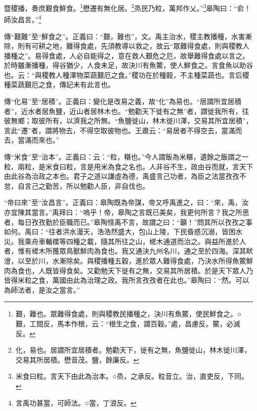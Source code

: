 暨稷播，奏庶艱食鮮食。\footnote{艱，難也。眾難得食處，則與稷教民播種之，決川有魚鱉，使民鮮食之。○艱，工間反，馬本作根，云：“根生之食，謂百穀。”處，昌慮反。鱉，必滅反。}懋遷有無化居。\footnote{化，易也。居謂所宜居積者。勉勸天下，徙有之無，魚鹽徙山，林木徙川澤，交易其所居積。懋音茂。鹽，餘廉反。}烝民乃粒，萬邦作乂。”\footnote{米食曰粒。言天下由此為治本。○烝，之承反。粒音立。治，直吏反，下同。}皋陶曰：“俞！師汝昌言。”\footnote{言禹功甚當，可師法。○當，丁浪反。}

{\noindent\zhuan{}\fzbyks 傳“艱難”至“鮮食之”。正義曰：“艱，難也”，文。禹主治水，稷主教播種，水害漸除，則有可耕之地，難得食處，先須教導以救之，故云“眾難得食處，則與稷教人播種之”。易得食處，人必自能得之，意在救人艱危之厄，故舉難得食處以言之。於時雖漸播種，得谷猶少，人食未足，故決川有魚鱉，使人鮮食之。言食魚以助谷也。云：“與稷教人種澤物菜蔬艱厄之食。”稷功在於種穀，不主種菜蔬也。言后稷種菜蔬艱厄之食，傳記未有此言也。 \par}

{\noindent\zhuan{}\fzbyks 傳“化易”至“居積”。正義曰：變化是改易之義，故“化”為易也。“居謂所宜居積者”，近水者居魚鹽，近山者居林木也。“勉勸天下徙有之無”者，謂徙我所有，往彼無鄉；取彼所有，以濟我之所無。“魚鹽徙山，林木徙川澤，交易其所宜居積”，言此“遷”者，謂將物去，不得空取彼物也。王肅云：“易居者不得空去，當滿而去，當滿而來也。” \par}

{\noindent\zhuan{}\fzbyks 傳“米食”至“治本”。正義曰：云：“粒，糂也。”今人謂飯為米糂，遺餘之飯謂之一粒、兩粒，是米食曰粒，言是用米為食之名也。人非谷不生，政由谷而就，言天下由此谷為治政之本也。君子之道以謙虛為德，禹盛言己功者，為臣之法當孜孜不怠，自言己之勤苦，所以勉勸人臣，非自伐也。 \par}

{\noindent\shu{}\fzkt “帝曰來”至“汝昌言”。正義曰：皋陶既為帝謀，帝又呼禹進之，曰：“來，禹，汝亦宜陳其當言。”禹拜曰：“嗚乎！帝，皋陶之言既已美矣，我更何所言？我之所思者，每日孜孜勤於臣職而已。”皋陶怪禹不言，故謂之曰：“籲！”問其所以孜孜之事如何。禹曰：“往者洪水漫天，浩浩然盛大，包山上陵，下民昏惑沉溺，皆困水災。我乘舟車輴樏等四種之載，隨其所往之山，槎木通道而治之。與益所進於人者，惟有槎木所獲眾鳥獸鮮肉為食也。我又通決九州名川，通之至於四海。深其畎澮，以至於川，水漸除矣。與稷播種五穀，進於眾人難得食處，乃決水所得魚鱉鮮肉為食也，人既皆得食矣。又勸勉天下徙有之無，交易其所居積。於是天下眾人乃皆得米粒之食，萬國由此為治理之政。我所言孜孜者在此也。”皋陶曰：“然。可以為師法者，是汝之當言。” \par}

